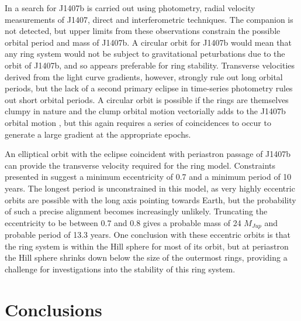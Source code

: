 \documentclass{emulateapj}
\begin{document}
In \citet{Kenworthy15} a search for J1407b is carried out using
photometry, radial velocity measurements of J1407, direct and
interferometric techniques.
The companion is not detected, but upper limits from these observations
constrain the possible orbital period and mass of J1407b.
A circular orbit for J1407b would mean that any ring system would not be
subject to gravitational peturbations due to the orbit of J1407b, and so
appears preferable for ring stability.
Transverse velocities derived from the light curve gradients, however,
strongly rule out long orbital periods, but the lack of a second primary
eclipse in time-series photometry rules out short orbital periods.
A circular orbit is possible if the rings are themselves clumpy in
nature and the clump orbital motion vectorially adds to the J1407b
orbital motion \citet{vanWerkhoven14}, but this again requires a series
of coincidences to occur to generate a large gradient at the appropriate
epochs.

An elliptical orbit with the eclipse coincident with periastron passage
of J1407b can provide the transverse velocity required for the ring
model.
Constraints presented in \citet{Kenworthy15} suggest a minimum
eccentricity of 0.7 and a minimum period of 10 years.
The longest period is unconstrained in this model, as very highly
eccentric orbits are possible with the long axis pointing towards Earth,
but the probability of such a precise alignment becomes increasingly unlikely.
Truncating the eccentricity to be between 0.7 and 0.8 gives a probable
mass of 24 $M_{Jup}$ and probable period of 13.3 years.
One conclusion with these eccentric orbits is that the ring
system is within the Hill sphere for most of its orbit, but at
periastron the Hill sphere shrinks down below the size of the outermost
rings, providing a challenge for investigations into the stability of
this ring system.

\section{Conclusions}
\label{sec:conc}
\end{document}
